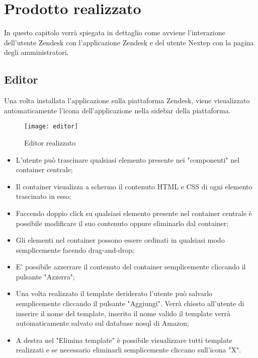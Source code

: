
\chapter{Prodotto realizzato}
\label{cap:verifica-validazione}
In questo capitolo verrà spiegata in dettaglio come avviene l’interazione dell’utente Zendesk con l'applicazione
Zendesk e del utente Nextep con la pagina degli amministratori.

\section{Editor}
Una volta installata l'applicazione sulla piattaforma Zendesk, viene visualizzato automaticamente l'icona dell'applicazione nella sidebar della piattaforma. 
\begin{figure}[!h] 
	\centering 
	\texttt{[image: editor]} 
	\caption{Editor realizzato }
\end{figure}
\begin{itemize}
	\item L'utente può trascinare qualsiasi elemento presente nei "componenti" nel container centrale;
	\item Il container visualizza a schermo il contenuto  HTML e CSS di ogni elemento trascinato in esso;
	\item Faccendo doppio click su qualsiasi elemento presente nel container centrale è possibile modificare il suo contenuto oppure eliminarlo dal container;
	\item Gli elementi nel container possono essere ordinati in qualsiasi modo semplicemente facendo drag-and-drop;
	\item E' possibile azzerrare il contenuto del container semplicemente cliccando il pulsante "Azzerra";
	\item Una volta realizzato il template deriderato l'utente può salvarlo semplicemente cliccando il pulsante "Aggiungi". Verrà chiesto all'utente di inserire il nome del template, inserito il nome valido il template verrà automaticamente salvato sul database nosql di Amazon;
	\item A destra nel "Elimina template" è possibile visualizzare tutti template realizzati e se necessario eliminarli semplicemente cliccano sull'icona "X".  
\end{itemize}
